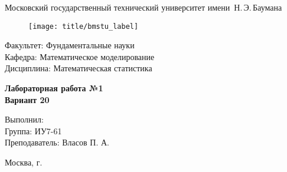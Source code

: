
\thispagestyle{empty}

\begin{center}
    \Large
    Московский государственный технический университет имени~Н.\,Э.\,Баумана
\end{center}

\begin{figure}[h!]
    \begin{center}
        \texttt{[image: title/bmstu\_label]}
    \end{center}
\end{figure}

\hfill\begin{minipage}{0.77\textwidth}
{\large
\noindent
Факультет: Фундаментальные науки\\[2mm]
\noindent
Кафедра:  Математическое моделирование\\[2mm]
\noindent
Дисциплина: Математическая статистика 
\vspace{1.5cm}}
\end{minipage}
\vfill

\begin{center}
    \Large
    \textbf{Лабораторная работа №1 \\Вариант 20}
\end{center}
\vfill

\hfill\begin{minipage}{0.6\textwidth}
    Выполнил: \\
    Группа: ИУ7-61\\
    Преподаватель: Власов П. А.
\end{minipage}
\vfill

\begin{center}
    Москва, \the\year\space г.
\end{center}